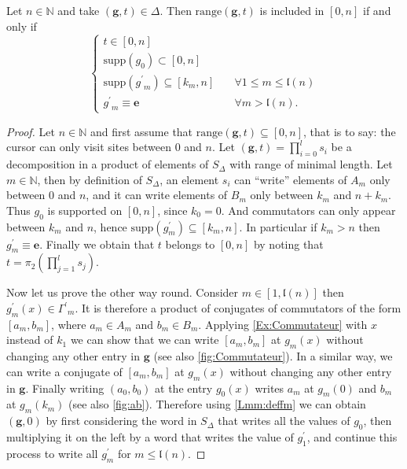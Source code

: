 \documentclass[english, 11pt, a4paper]{article}
\theoremstyle{definition}
\numberwithin{equation}{section}
\newcommand{\bN}{\mathbb{N}}
\newcommand{\mbfg}{\boldsymbol{g}}
\newcommand{\neutre}{\boldsymbol{e}}
\newcommand{\Gsp}{{\Gamma^\prime}_m}
\newcommand{\BZ}{\Delta}
\newcommand{\range}{\mathrm{range}}
\newcommand{\supp}{\mathrm{supp}}
\newcommand{\landing}{\mathfrak{l}}
\begin{document}
\begin{Lmm}\label{Lmm:range}
  Let $n\in \bN$ and take $(\mbfg,t) \in \Delta$.
  Then $\range(\mbfg,t)$ is included in $ [0,n] $ if and only if
  \begin{equation*}
    \begin{cases}
      t\in [0,n] \\
      \supp(g_0) \subset [0, n]\\
      \supp({g^\prime}_m) \subseteq [k_m,  n] \quad &\forall 1\leq m \leq \landing(n)  \\
      {g^\prime}_m\equiv \neutre \quad &\forall m > \landing(n).
    \end{cases}
  \end{equation*}
\end{Lmm}
\begin{proof}
  Let $n \in \bN$ and first assume that $\range(\mbfg,t)\subseteq [0,n]$, that
  is to say: the cursor 
  can only visit sites between $0$ and $n$. Let $(\mbfg,t)=\prod^{l}_{i=0} s_i$
  be a decomposition in a product of elements of $S_{\BZ}$ with range of minimal length.
  Let $m\in \bN$, then by definition of 
  $S_{\BZ}$, an element $s_i$ can “write” elements of $A_m$ only between $0$ and
  $n$, and it can write elements of $B_m$ only between $k_m$ and $n+k_m$. Thus $g_0$ is
  supported on $[0,n]$, since $k_0=0$. And commutators can only appear between
  $k_m$ and $n$, hence $\supp(g^\prime_m)\subseteq [k_m,n]$. In particular if
  $k_m>n$ then $g^\prime_m \equiv \neutre$. Finally we obtain that $t$ belongs
  to $[0,n]$ by noting that $t=\pi_2\left(\prod^{l}_{j=1}s_j \right)$.

  Now let us prove the other way round. Consider $m\in [1,\landing(n)]$ then
  $g^{\prime}_m(x)\in \Gsp$. It is therefore a product of conjugates of
  commutators of the form $[a_m,b_m]$, where $a_m\in A_m$ and $b_m\in B_m$.
  Applying \cref{Ex:Commutateur} with $x$ instead of $k_1$ we can show that we
  can write $[a_m,b_m]$ at $g_m(x)$ without changing any other entry in $\mbfg$
  (see also \cref{fig:Commutateur}). In a similar way, we can write a conjugate
  of $[a_m,b_m]$ at $g_m(x)$ without changing any other entry in $\mbfg$.
  Finally writing $(a_0,b_0)$ at the entry $g_0(x)$ writes $a_m$ at $g_m(0)$ and
  $b_m$ at $g_m(k_m)$ (see also \cref{fig:ab}). Therefore using
  \cref{Lmm:deffm} we can obtain 
  $(\mbfg,0)$ by first considering the word in $S_\BZ$ that writes
  all the values of $g_0$, then multiplying it on the left by a word that writes
  the value of $g^{\prime}_1$, and continue this process to write all
  $g^{\prime}_m$ for $m\leq \landing(n)$.


\end{proof}
\end{document}
